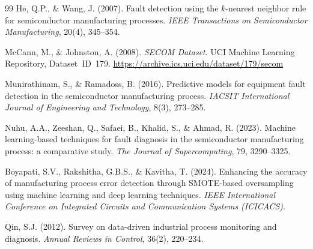 \documentclass[11pt,letterpaper]{article}
\theoremstyle{scresult}
\begin{document}
\begin{thebibliography}{99}
He, Q.P., \& Wang, J. (2007).
Fault detection using the $k$-nearest neighbor rule for semiconductor
manufacturing processes.
\textit{IEEE Transactions on Semiconductor Manufacturing}, 20(4), 345--354.

McCann, M., \& Johnston, A. (2008).
\textit{SECOM Dataset}.
UCI Machine Learning Repository, Dataset~ID~179.
\url{https://archive.ics.uci.edu/dataset/179/secom}

Munirathinam, S., \& Ramadoss, B. (2016).
Predictive models for equipment fault detection in the semiconductor
manufacturing process.
\textit{IACSIT International Journal of Engineering and Technology}, 8(3),
273--285.

Nuhu, A.A., Zeeshan, Q., Safaei, B., Khalid, S., \& Ahmad, R. (2023).
Machine learning-based techniques for fault diagnosis in the semiconductor
manufacturing process: a comparative study.
\textit{The Journal of Supercomputing}, 79, 3290--3325.

Boyapati, S.V., Rakshitha, G.B.S., \& Kavitha, T. (2024).
Enhancing the accuracy of manufacturing process error detection through
SMOTE-based oversampling using machine learning and deep learning techniques.
\textit{IEEE International Conference on Integrated Circuits and Communication
Systems (ICICACS)}.

Qin, S.J. (2012).
Survey on data-driven industrial process monitoring and diagnosis.
\textit{Annual Reviews in Control}, 36(2), 220--234.

\end{thebibliography}
\end{document}
